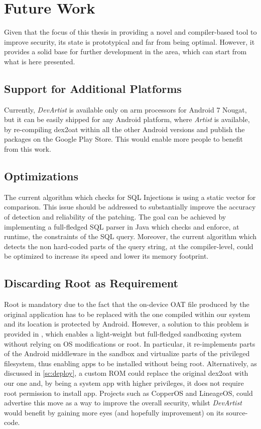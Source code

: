 \chapter{Future Work}
\label{ch:futurework}
Given that the focus of this thesis in providing a novel and compiler-based tool to improve security, its state is prototypical and far from being optimal. However, it provides a solid base for further development in the area, which can start from what is here presented.

\section{Support for Additional Platforms}
Currently, \emph{DevArtist} is available only on arm processors for Android 7 Nougat, but it can be easily shipped for any Android platform, where \emph{Artist} is available, by re-compiling dex2oat within all the other Android versions and publish the packages on the Google Play Store. This would enable more people to benefit from this work.

\section{Optimizations}
The current algorithm which checks for SQL Injections is using a static vector for comparison. This issue should be addressed to substantially improve the accuracy of detection and reliability of the patching. The goal can be achieved by implementing a full-fledged SQL parser in Java which checks and enforce, at runtime, the constraints of the SQL query. Moreover, the current algorithm which detects the non hard-coded parts of the query string, at the compiler-level, could be optimized to increase its speed and lower its memory footprint.

\section{Discarding Root as Requirement}
\label{sc:discardroot}
Root is mandatory due to the fact that the on-device OAT file produced by the original application has to be replaced with the one compiled within our system and its location is protected by Android. However, a solution to this problem is provided in \cite{boxify}, which enables a light-weight but full-fledged sandboxing system without relying on OS modifications or root. In particular, it re-implements parts of the Android middleware in the sandbox and virtualize parts of the privileged filesystem, thus enabling apps to be installed without being root. Alternatively, as discussed in \ref{sc:deploy}, a custom ROM could replace the original dex2oat with our one and, by being a system app with higher privileges, it does not require root permission to install app. Projects such as CopperOS and LineageOS, could advertise this move as a way to improve the overall security, whilst \emph{DevArtist} would benefit by gaining more eyes (and hopefully improvement) on its source-code.

